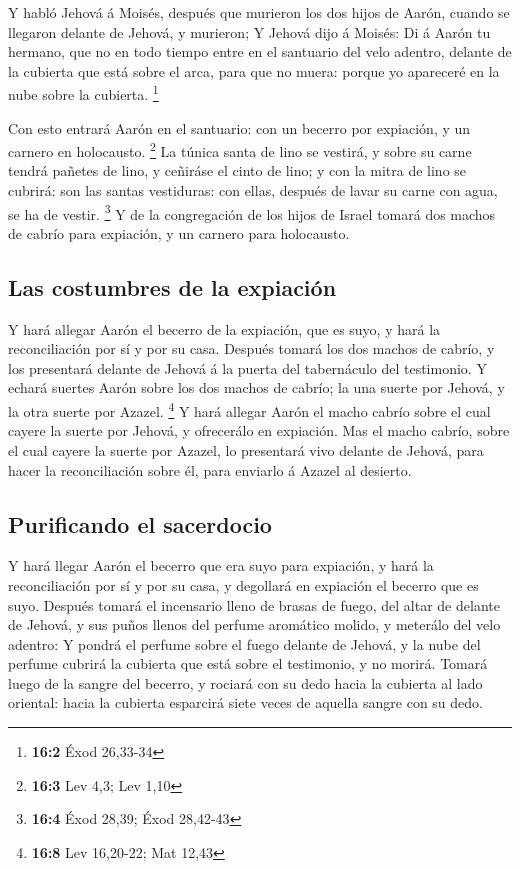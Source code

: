  Y habló Jehová á Moisés, después que murieron los dos
hijos de Aarón, cuando se llegaron delante de Jehová, y murieron;
 Y Jehová dijo á Moisés: Di á Aarón tu hermano, que no en
todo tiempo entre en el santuario del velo adentro, delante de la
cubierta que está sobre el arca, para que no muera: porque yo apareceré
en la nube sobre la cubierta. \footnote{\textbf{16:2} Éxod 26,33-34}

 Con esto entrará Aarón en el santuario: con un becerro
por expiación, y un carnero en holocausto. \footnote{\textbf{16:3} Lev
  4,3; Lev 1,10}  La túnica santa de lino se vestirá, y
sobre su carne tendrá pañetes de lino, y ceñiráse el cinto de lino; y
con la mitra de lino se cubrirá: son las santas vestiduras: con ellas,
después de lavar su carne con agua, se ha de vestir. \footnote{\textbf{16:4}
  Éxod 28,39; Éxod 28,42-43}  Y de la congregación de los
hijos de Israel tomará dos machos de cabrío para expiación, y un carnero
para holocausto.

\hypertarget{las-costumbres-de-la-expiaciuxf3n}{%
\subsection{Las costumbres de la
expiación}\label{las-costumbres-de-la-expiaciuxf3n}}

 Y hará allegar Aarón el becerro de la expiación, que es
suyo, y hará la reconciliación por sí y por su casa. 
Después tomará los dos machos de cabrío, y los presentará delante de
Jehová á la puerta del tabernáculo del testimonio.  Y
echará suertes Aarón sobre los dos machos de cabrío; la una suerte por
Jehová, y la otra suerte por Azazel. \footnote{\textbf{16:8} Lev
  16,20-22; Mat 12,43}  Y hará allegar Aarón el macho
cabrío sobre el cual cayere la suerte por Jehová, y ofrecerálo en
expiación.  Mas el macho cabrío, sobre el cual cayere la
suerte por Azazel, lo presentará vivo delante de Jehová, para hacer la
reconciliación sobre él, para enviarlo á Azazel al desierto.

\hypertarget{purificando-el-sacerdocio}{%
\subsection{Purificando el sacerdocio}\label{purificando-el-sacerdocio}}

 Y hará llegar Aarón el becerro que era suyo para
expiación, y hará la reconciliación por sí y por su casa, y degollará en
expiación el becerro que es suyo.  Después tomará el
incensario lleno de brasas de fuego, del altar de delante de Jehová, y
sus puños llenos del perfume aromático molido, y meterálo del velo
adentro:  Y pondrá el perfume sobre el fuego delante de
Jehová, y la nube del perfume cubrirá la cubierta que está sobre el
testimonio, y no morirá.  Tomará luego de la sangre del
becerro, y rociará con su dedo hacia la cubierta al lado oriental: hacia
la cubierta esparcirá siete veces de aquella sangre con su dedo.

